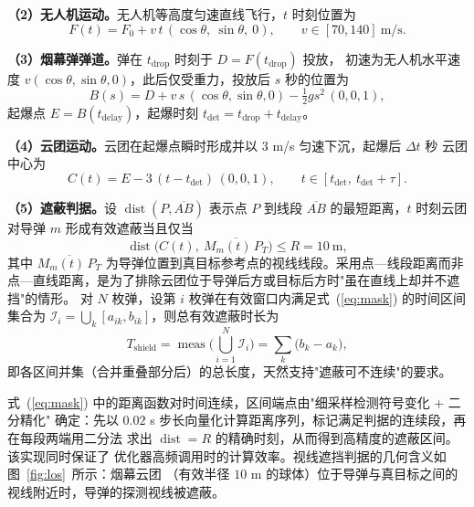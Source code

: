 \documentclass[12pt, a4paper]{article}
\begin{document}
\textbf{（2）无人机运动。}无人机等高度匀速直线飞行，$t$ 时刻位置为
\begin{equation}
    F(t) = F_0 + v\, t\, (\cos\theta,\ \sin\theta,\ 0),\qquad v\in[70,140]\ \text{m/s}.
    \label{eq:uav}
\end{equation}

\textbf{（3）烟幕弹弹道。}弹在 $t_{\mathrm{drop}}$ 时刻于 $D=F(t_{\mathrm{drop}})$ 投放，
初速为无人机水平速度 $v(\cos\theta,\sin\theta,0)$，此后仅受重力，投放后 $s$ 秒的位置为
\begin{equation}
    B(s) = D + v\, s\,(\cos\theta,\sin\theta,0) - \tfrac{1}{2} g s^2\,(0,0,1),
    \label{eq:ballistic}
\end{equation}
起爆点 $E = B(t_{\mathrm{delay}})$，起爆时刻 $t_{\mathrm{det}}=t_{\mathrm{drop}}+t_{\mathrm{delay}}$。

\textbf{（4）云团运动。}云团在起爆点瞬时形成并以 $3$ m/s 匀速下沉，起爆后 $\Delta t$ 秒
云团中心为
\begin{equation}
    C(t) = E - 3\,(t-t_{\mathrm{det}})\,(0,0,1),\qquad t\in[t_{\mathrm{det}},\ t_{\mathrm{det}}+\tau].
    \label{eq:cloud}
\end{equation}

\textbf{（5）遮蔽判据。}设 $\operatorname{dist}(P, \overline{AB})$ 表示点 $P$ 到线段
$\overline{AB}$ 的最短距离，$t$ 时刻云团对导弹 $m$ 形成有效遮蔽当且仅当
\begin{equation}
    \operatorname{dist}\!\big(C(t),\ \overline{M_m(t)\,P_T}\big) \leq R = 10\ \text{m},
    \label{eq:mask}
\end{equation}
其中 $\overline{M_m(t)\,P_T}$ 为导弹位置到真目标参考点的视线线段。采用点—线段距离而非
点—直线距离，是为了排除云团位于导弹后方或目标后方时"虽在直线上却并不遮挡"的情形。
对 $N$ 枚弹，设第 $i$ 枚弹在有效窗口内满足式~(\ref{eq:mask}) 的时间区间集合为
$\mathcal{I}_i=\bigcup_k[a_{ik},b_{ik}]$，则总有效遮蔽时长为
\begin{equation}
    T_{\mathrm{shield}} = \operatorname{meas}\!\Big(\bigcup_{i=1}^{N}\mathcal{I}_i\Big)
    = \sum_{k} \big(b_k - a_k\big),
    \label{eq:union}
\end{equation}
即各区间并集（合并重叠部分后）的总长度，天然支持"遮蔽可不连续"的要求。

式~(\ref{eq:mask}) 中的距离函数对时间连续，区间端点由"细采样检测符号变化 + 二分精化"
确定：先以 $0.02$ s 步长向量化计算距离序列，标记满足判据的连续段，再在每段两端用二分法
求出 $\operatorname{dist}=R$ 的精确时刻，从而得到高精度的遮蔽区间。该实现同时保证了
优化器高频调用时的计算效率。视线遮挡判据的几何含义如图~\ref{fig:los}~所示：烟幕云团
（有效半径 $10$ m 的球体）位于导弹与真目标之间的视线附近时，导弹的探测视线被遮蔽。
\end{document}
